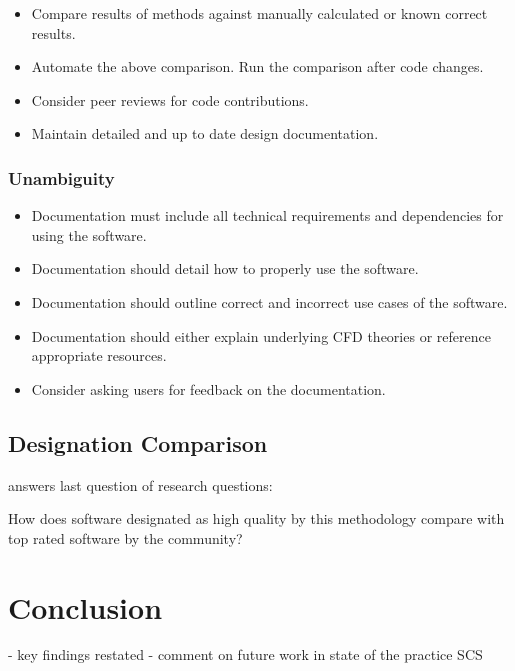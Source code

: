 \documentclass[12pt, notitlepage]{article}
\begin{document}
\begin{itemize}
	\item Compare results of methods against manually calculated or known correct results.
	\item Automate the above comparison. Run the comparison after code changes.
	\item Consider peer reviews for code contributions.
	\item Maintain detailed and up to date design documentation.
\end{itemize}

\subsubsection{Unambiguity}

\begin{itemize}
	\item Documentation must include all technical requirements and dependencies for using the software. 
	\item Documentation should detail how to properly use the software.
	\item Documentation should outline correct and incorrect use cases of the software.
	\item Documentation should either explain underlying CFD theories or reference appropriate resources.
	\item Consider asking users for feedback on the documentation.
\end{itemize}


\subsection{Designation Comparison}

answers last question of research questions:

How does software designated as high quality by this methodology compare	with top rated software by the community?


\newpage
\section{Conclusion}

- key findings restated
- comment on future work in state of the practice SCS

\newpage
\end{document}
